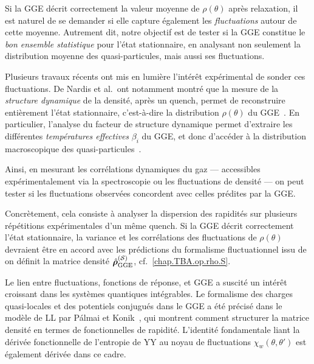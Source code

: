 \medskip

Si la \gls{GGE} décrit correctement la valeur moyenne de \( \rho(\theta) \) après relaxation, il est naturel de se demander si elle capture également les \emph{fluctuations} autour de cette moyenne. Autrement dit, notre objectif est de tester si la \gls{GGE} constitue le \textit{bon ensemble statistique} pour l’état stationnaire, en analysant non seulement la distribution moyenne des quasi-particules, mais aussi ses fluctuations.\\

\medskip

Plusieurs travaux récents ont mis en lumière l’intérêt expérimental de sonder ces fluctuations. De Nardis et al.\ ont notamment montré que la mesure de la \textit{structure dynamique} de la densité, après un quench, permet de reconstruire entièrement l’état stationnaire, c’est-à-dire la distribution \( \rho(\theta) \) du \gls{GGE}~\cite{DeNardis2017}. En particulier, l’analyse du facteur de structure dynamique permet d’extraire les différentes \textit{températures effectives} \( \beta_i \) du \gls{GGE}, et donc d’accéder à la distribution macroscopique des quasi-particules~\cite{Goldstein2013,CauxKonik2012}.

\medskip

Ainsi, en mesurant les corrélations dynamiques du gaz — accessibles expérimentalement via la spectroscopie ou les fluctuations de densité — on peut tester si les fluctuations observées concordent avec celles prédites par la \gls{GGE}.

\medskip

Concrètement, cela consiste à analyser la dispersion des  rapidités sur plusieurs répétitions expérimentales d’un même quench. Si la \gls*{GGE} décrit correctement l’état stationnaire, la variance et les corrélations des fluctuations de \( \rho(\theta) \) devraient être en accord avec les prédictions du formalisme fluctuationnel issu de on définit la matrice densité \( \hat{\bm{\rho}}^{(\mathcal{S})}_{\mathrm{GGE}} \), cf.~\eqref{chap.TBA.op.rho.S}.

\medskip

Le lien entre fluctuations, fonctions de réponse, et \gls{GGE} a suscité un intérêt croissant dans les systèmes quantiques intégrables. Le formalisme des charges quasi-locales et des potentiels conjugués dans le \gls*{GGE} a été précisé dans le modèle de \acrlong{LL} par Pálmai et Konik~\cite{Palmai2018}, qui montrent comment structurer la matrice densité en termes de fonctionnelles de rapidité. L'identité fondamentale liant la dérivée fonctionnelle de l'entropie de \gls{YY} au noyau de fluctuations $\chi_w(\theta,\theta')$ est également dérivée dans ce cadre.

